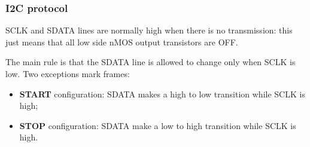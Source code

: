 \documentclass[a4paper,11pt]{article}
\begin{document}
\subsubsection{I2C protocol}

SCLK and SDATA lines are normally high when there is no transmission: this just means that all low side nMOS output transistors are OFF.

The main rule is that the SDATA line is allowed to change only when SCLK is low.
Two exceptions mark frames:
\begin{itemize}
	\item \textbf{START} configuration: SDATA makes a high to low transition while SCLK is high;
	\item \textbf{STOP} configuration: SDATA make a low to high transition while SCLK is high.
\end{itemize}
\end{document}
